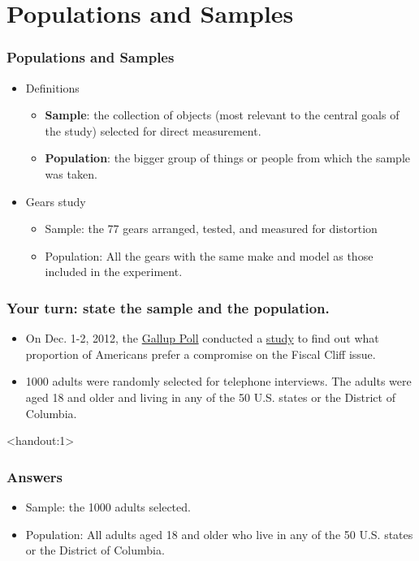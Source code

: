 \documentclass[handout]{beamer}
\newcommand{\answers}{1}
\numberwithin{equation}{section}
\begin{document}
\section{Populations and Samples}

\begin{frame}
\frametitle{Populations and Samples}
\begin{itemize}
\item Definitions
\begin{itemize}
\item {\bf Sample}: the collection of objects (most relevant to the central goals of the study) selected for direct measurement.  
\pause \item {\bf Population}: the bigger group of things or people from which the sample was taken. 
\end{itemize}
\pause \item Gears study
\begin{itemize}
\item Sample: the 77 gears arranged, tested, and measured for distortion
\pause \item Population: All the gears with the same make and model as those included in the experiment.
\end{itemize}
\end{itemize}
\end{frame}

\begin{frame}
\frametitle{Your turn: state the sample and the population.} \small
\begin{itemize}
\item On Dec. 1-2, 2012, the \href{http://www.gallup.com/}{Gallup Poll} conducted a \href{http://www.gallup.com/poll/159065/americans-widely-prefer-compromise-fiscal-cliff.aspx}{study} to find out what proportion of Americans prefer a compromise on the Fiscal Cliff issue. 
\pause \item 1000 adults were randomly selected for telephone interviews. The adults were aged 18 and older and living in any of the 50 U.S. states or the District of Columbia.
\end{itemize}
\end{frame}

\begin{frame}<handout:\answers>
\frametitle{Answers}
\begin{itemize}
\item Sample: the 1000 adults selected.
\pause \item Population: All adults aged 18 and older who live in any of the 50 U.S. states or the District of Columbia.
\end{itemize}
\end{frame}
\end{document}
